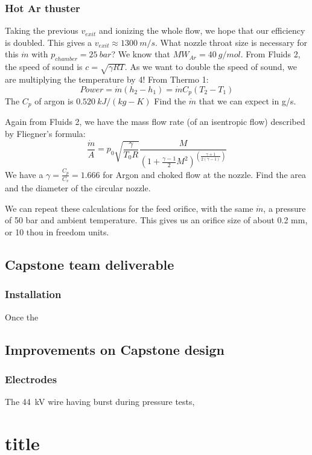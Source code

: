             \subsubsection{Hot Ar thuster}
            Taking the previous $v_{exit}$ and ionizing the whole flow, we hope that our efficiency is doubled. This gives a $v_{exit}\approx 1300\:m/s$. What nozzle throat size is necessary for this $\dot m$ with $p_{chamber} = 25\: bar$? We know that $MW_{Ar} = 40 \: g/mol$. From Fluids 2, the speed of sound is $c = \sqrt{\gamma R T}$. As we want to double the speed of sound, we are multiplying the temperature by 4! From Thermo 1:
            \[Power = \dot m (h_2-h_1)
            = \dot m C_p (T_2-T_1)\]
            The $C_p$ of argon is $0.520\:kJ/(kg-K)$ Find the $\dot m$ that we can expect in g/s.\vspace{60mm}
            
            Again from Fluids 2, we have the mass flow rate (of an isentropic flow) described by Fliegner's formula:
            \[\frac{\dot m}{A} = p_0\sqrt{\frac{\gamma}{T_0 R}}\frac{M}{(1+\frac{\gamma-1}{2}M^2)^{(\frac{\gamma+1}{2(\gamma-1)})}}\]
            We have a $\gamma = \frac{C_p}{C_v} = 1.666$ for Argon and choked flow at the nozzle. Find the area and the diameter of the circular nozzle.\vspace{170 mm}
            
            We can repeat these calculations for the feed orifice, with the same $\dot m$, a pressure of 50 bar and ambient temperature. This gives us an orifice size of about 0.2 mm, or 10 thou in freedom units.

        \subsection{Capstone team deliverable}
            
            \subsubsection{Installation}

                Once the 

        \subsection{Improvements on Capstone design}

            \subsubsection{Electrodes}
                The \qty{44}{kV} wire having burst during pressure tests, 


    
    \section{title}
